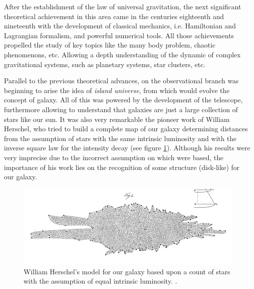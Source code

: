 After the establishment of the law of universal gravitation, the next 
significant theo\-retical achievement in this area came in the centuries 
eighteenth and nineteenth with the development of classical mechanics, i.e.
Hamiltonian and Lagrangian formalism, and powerful numerical tools. All
those achievements propelled the study of key topics like the many body 
problem, chaotic phenomenons, etc. Allowing a depth understanding of the 
dynamic of complex gravitational systems, such as planetary systems, star 
clusters, etc. 


Parallel to the previous theoretical advances, on the observational branch 
was beginning to arise the idea of \textit{island universe}, from which 
would evolve the concept of galaxy. All of this was powered by the 
development of the telescope, furthermore allowing to understand that  
galaxies are just a large collection of stars like our sun. It was also 
very remarkable the pioneer work of William Herschel, who tried to build a
complete map of our galaxy determining distances from the assumption of 
stars with the same intrinsic luminosity and with the inverse square law 
for the intensity decay (see figure \ref{fig:HerschelModel}). 
Although his results were very imprecise due to the incorrect assumption 
on which were based, the importance of his work lies on the recognition of 
some structure (disk-like) for our galaxy. 


\begin{figure}[htbp]
	\centering
	\includegraphics[width=1.0\textwidth]
	{./figures/1_introduction/Herschel_Model.png}
	
	\caption{\small{William Herschel's model for our galaxy based upon a 
	count of stars with the assumption of equal intrinsic luminosity.
	\cite{Herschel1785}.}}
	
	\label{fig:HerschelModel}
\end{figure}
\newpage


